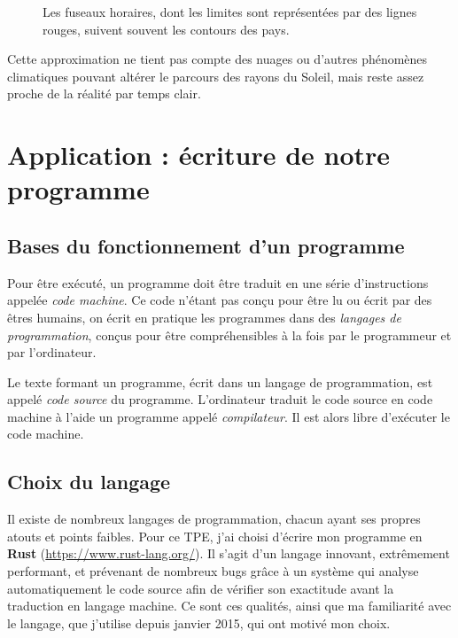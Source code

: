 \documentclass[12pt]{article}
\begin{document}
\begin{figure}[!ht]
  \centering
  \caption{Les fuseaux horaires, dont les limites sont représentées par des lignes rouges, suivent souvent les contours des pays.}
  \label{fig:timezones}
\end{figure}

Cette approximation ne tient pas compte des nuages ou d'autres phénomènes climatiques pouvant altérer le parcours des rayons du Soleil, mais reste assez proche de la réalité par temps clair.


\clearpage
\section{Application : écriture de notre programme}

\subsection{Bases du fonctionnement d'un programme}

Pour être exécuté, un programme doit être traduit en une série d'instructions appelée \emph{code machine}. Ce code n'étant pas conçu pour être lu ou écrit par des êtres humains, on écrit en pratique les programmes dans des \emph{langages de programmation}, conçus pour être compréhensibles à la fois par le programmeur et par l'ordinateur.

Le texte formant un programme, écrit dans un langage de programmation, est appelé \emph{code source} du programme. L'ordinateur traduit le code source en code machine à l'aide un programme appelé \emph{compilateur}. Il est alors libre d'exécuter le code machine.

\subsection{Choix du langage}
Il existe de nombreux langages de programmation, chacun ayant ses propres atouts et points faibles. Pour ce TPE, j'ai choisi d'écrire mon programme en \textbf{Rust} (\url{https://www.rust-lang.org/}). Il s'agit d'un langage innovant, extrêmement performant, et prévenant de nombreux bugs grâce à un système qui analyse automatiquement le code source afin de vérifier son exactitude avant la traduction en langage machine. Ce sont ces qualités, ainsi que ma familiarité avec le langage, que j'utilise depuis janvier 2015, qui ont motivé mon choix.
\end{document}
